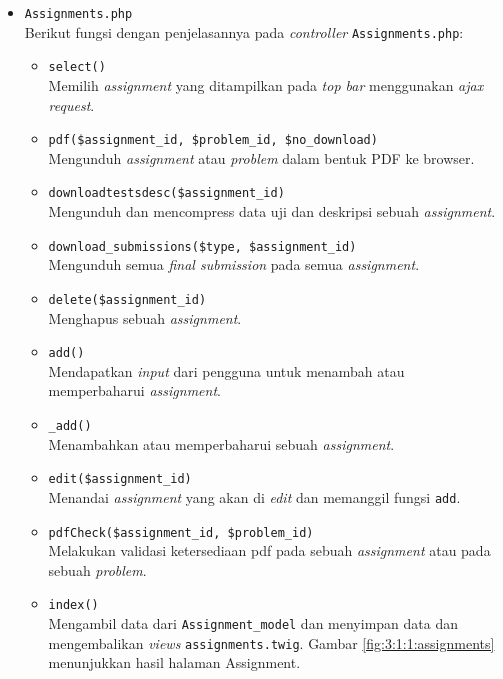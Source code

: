\begin{itemize}
	\item \verb|Assignments.php| \\
	      Berikut fungsi dengan penjelasannya pada \textit{controller} \verb|Assignments.php|:


	      \begin{itemize}
		      \item \verb|select()| \\
		            Memilih \textit{assignment} yang ditampilkan pada \textit{top bar} menggunakan \textit{ajax request}.
		      \item \verb|pdf($assignment_id, $problem_id, $no_download)| \\
		            Mengunduh \textit{assignment} atau \textit{problem} dalam bentuk PDF ke browser.
		      \item \verb|downloadtestsdesc($assignment_id)| \\
		            Mengunduh dan mencompress data uji dan deskripsi sebuah \textit{assignment}.
		      \item \verb|download_submissions($type, $assignment_id)| \\
		            Mengunduh semua \textit{final submission} pada semua \textit{assignment}.
		      \item \verb|delete($assignment_id)| \\
		            Menghapus sebuah \textit{assignment}.
		      \item \verb|add()| \\
		            Mendapatkan \textit{input} dari pengguna untuk menambah atau memperbaharui \textit{assignment}.
		      \item \verb|_add()| \\
		            Menambahkan atau memperbaharui sebuah \textit{assignment}.
		      \item \verb|edit($assignment_id)| \\
		            Menandai \textit{assignment} yang akan di \textit{edit} dan memanggil fungsi \verb|add|.
		      \item \verb|pdfCheck($assignment_id, $problem_id)| \\
		            Melakukan validasi ketersediaan pdf pada sebuah \textit{assignment} atau pada sebuah \textit{problem}.
		      \item \verb|index()| \\
		            Mengambil data dari \verb|Assignment_model| dan menyimpan data dan mengembalikan \textit{views} \verb|assignments.twig|. Gambar \ref{fig:3:1:1:assignments} menunjukkan hasil halaman Assignment.


\end{itemize}
\end{itemize}
